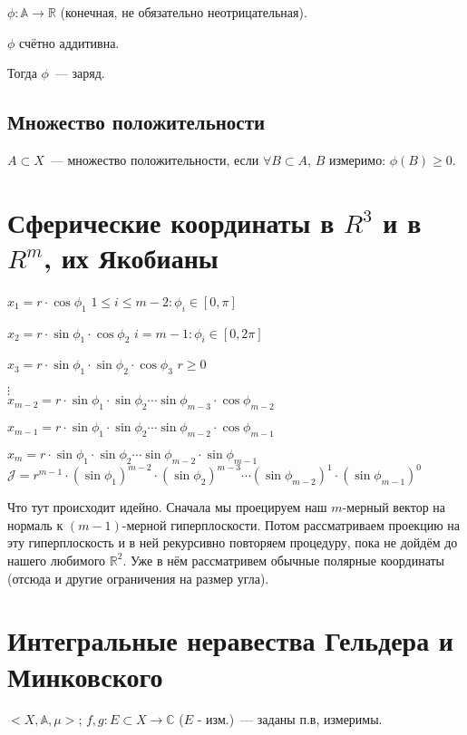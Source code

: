 \documentclass[paper=a4, fontsize=17pt]{article}
\begin{document}
	$\phi: \mathds{A} \to \mathds{R}$ (конечная, не обязательно неотрицательная).

	$\phi$ счётно аддитивна.

	Тогда $\phi$~--- заряд.

	\subsection{Множество положительности}
	$A \subset X$~--- множество положительности, если
	$\forall B \subset A$, $B$ измеримо: $\phi(B) \geq 0$.

	\section{Сферические координаты в $ R^3 $ и в $ R^m $, их Якобианы}
	$x_1 = r \cdot \cos \phi_1$
    \hfill
	$1 \leq i \leq m-2: \phi_i \in [0,\pi]$

	$x_2 = r \cdot \sin \phi_1 \cdot \cos \phi_2$
    \hfill
	$i=m-1: \phi_i \in [0,2\pi]$

	$x_3 = r \cdot \sin \phi_1 \cdot \sin \phi_2 \cdot \cos \phi_3$
    \hfill
    $r \geq 0$

    $\vdots$\\
	$x_{m-2} = r \cdot \sin \phi_1 \cdot \sin \phi_2 \cdots \sin \phi_{m-3} \cdot \cos \phi_{m-2}$

	$x_{m-1} = r \cdot \sin \phi_1 \cdot \sin \phi_2 \cdots \sin \phi_{m-2} \cdot \cos \phi_{m-1}$


	$x_{m} = r \cdot \sin \phi_1 \cdot \sin \phi_2 \cdots \sin \phi_{m-2} \cdot \sin \phi_{m-1}$\\

	$\mathcal{J} = r^{m-1} \cdot (\sin \phi_1)^{m-2} \cdot (\sin \phi_2)^{m-3} \cdots (\sin \phi_{m-2})^{1} \cdot (\sin \phi_{m-1})^{0}$

	Что тут происходит идейно. Сначала мы проецируем наш $m$-мерный вектор на нормаль к $(m-1)$-мерной гиперплоскости. Потом рассматриваем проекцию на эту гиперплоскость и в ней рекурсивно повторяем процедуру, пока не дойдём до нашего любимого $\mathds{R}^2$. Уже в нём рассматривем обычные полярные координаты (отсюда и другие ограничения на размер угла).

	\section{Интегральные неравества Гельдера и Минковского}
	$<X, \mathds{A}, \mu>$; $f, g : E \subset X \rightarrow \mathds{C}$ ($E$ - изм.)~--- заданы п.в, измеримы.\\
\end{document}
